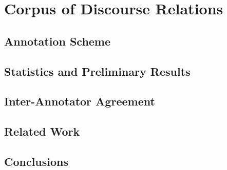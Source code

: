 \chapter{Corpus of Discourse Relations}
\section{Annotation Scheme}
\section{Statistics and Preliminary Results}
\section{Inter-Annotator Agreement}
\section{Related Work}
\section{Conclusions}
